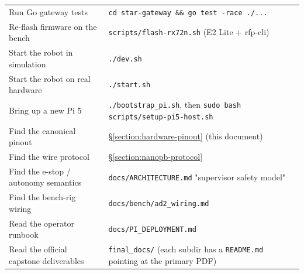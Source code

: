 \begin{center}
\begin{tabular}{|p{6.5cm}|p{8.0cm}|}
Run Go gateway tests                                                  & \texttt{cd star-gateway \&\& go test -race ./...}                                                                                                \\
Re-flash firmware on the bench                                        & \texttt{scripts/flash-rx72n.sh} (E2 Lite + rfp-cli)                                                                                              \\
Start the robot in simulation                                         & \texttt{./dev.sh}                                                                                                                                \\
Start the robot on real hardware                                      & \texttt{./start.sh}                                                                                                                              \\
Bring up a new Pi 5                                                   & \texttt{./bootstrap\_pi.sh}, then \texttt{sudo bash scripts/setup-pi5-host.sh}                                                                   \\
Find the canonical pinout                                             & \S\ref{section:hardware-pinout} (this document)                                                                                                  \\
Find the wire protocol                                                & \S\ref{section:nanopb-protocol}                                                                                                                  \\
Find the e-stop / autonomy semantics                                  & \texttt{docs/ARCHITECTURE.md} "supervisor safety model"                                                                                          \\
Find the bench-rig wiring                                             & \texttt{docs/bench/ad2\_wiring.md}                                                                                                              \\
Read the operator runbook                                             & \texttt{docs/PI\_DEPLOYMENT.md}                                                                                                                  \\
Read the official capstone deliverables                                & \texttt{final\_docs/} (each subdir has a \texttt{README.md} pointing at the primary PDF)                                                          \\
\hline
\end{tabular}
\end{center}

